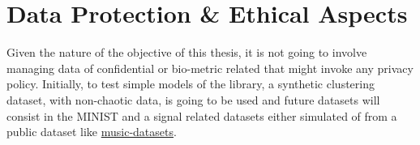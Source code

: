 \section{Data Protection \& Ethical Aspects}
Given the nature of the objective of this thesis, it is not going to involve managing data of confidential or bio-metric related that might invoke any privacy policy. Initially, to test simple models of the library, a synthetic clustering dataset, with non-chaotic data, is going to be used and future datasets will consist in the MINIST \parencite{lecun1998mnist} and a signal related datasets either simulated of from a public dataset like \href{https://speed.pub.ro/downloads/music-datasets/}{music-datasets}.









